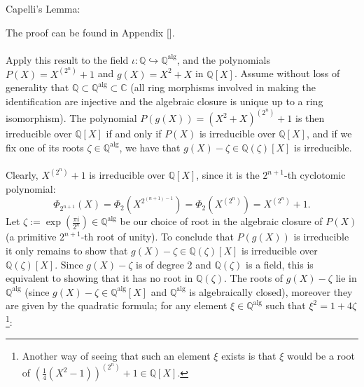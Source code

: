 \begin{solution}
\begin{lemma}{Capelli's Lemma:}
\begin{enumerate}
        \end{enumerate}
    \end{lemma}
    The proof can be found in Appendix [].
    \\\\
    Apply this result to the field \( \iota:\mathbb{Q}\hookrightarrow \mathbb{Q}^{\mathrm{alg}} \), and the polynomials \( P\left(X\right) = X^{\left(2^{n}\right)} + 1 \) and \( g\left(X\right) = X^2 + X \) in \( \mathbb{Q}\left[X\right] \). Assume without loss of generality that \( \mathbb{Q}\subset\mathbb{Q}^{\text{alg}}\subset\mathbb{C} \) (all ring morphisms involved in making the identification are injective and the algebraic closure is unique up to a ring isomorphism). The polynomial \( P\left( g\left(X\right) \right) = \left( X^2 + X \right)^{\left(2^n\right)} + 1 \) is then irreducible over \( \mathbb{Q}\left[X\right] \) if and only if \( P\left(X\right) \) is irreducible over \( \mathbb{Q}\left[X\right] \), and if we fix one of its roots \( \zeta \in \mathbb{Q}^{\mathrm{alg}} \), we have that \( g\left(X\right) - \zeta \in \mathbb{Q}\left(\zeta\right)\left[X\right] \) is irreducible.
    \\\\
    Clearly, \( X^{\left(2^n\right)} + 1 \) is irreducible over \( \mathbb{Q}\left[X\right] \), since it is the \( 2^{n+1} \)-th cyclotomic polynomial:
    \[
        \Phi_{2^{n+1}}\left(X\right) = \Phi_{2}\left( X^{2^{\left(n+1\right)-1}} \right) = \Phi_{2}\left( X^{\left(2^{n}\right)} \right) = X^{\left(2^{n}\right)} + 1.
    \]
    Let \( \zeta := \exp\left( \frac{\pi i}{2^{n}} \right) \in \mathbb{Q}^{\text{alg}} \) be our choice of root in the algebraic closure of \( P\left(X\right) \) (a primitive \( 2^{n+1} \)-th root of unity). To conclude that \( P\left( g\left(X\right) \right) \) is irreducible it only remains to show that \( g\left(X\right) - \zeta \in \mathbb{Q}\left(\zeta\right)\left[X\right] \) is irreducible over \( \mathbb{Q}\left(\zeta\right)\left[X\right] \). Since \( g\left(X\right) - \zeta \) is of degree \( 2 \) and \( \mathbb{Q}\left(\zeta\right) \) is a field, this is equivalent to showing that it has no root in \( \mathbb{Q}\left(\zeta\right) \). The roots of \( g\left(X\right) - \zeta \) lie in \( \mathbb{Q}^{\text{alg}} \) (since \( g\left(X\right) - \zeta\in \mathbb{Q}^{\text{alg}}\left[X\right] \) and \( \mathbb{Q}^{\text{alg}} \) is algebraically closed), moreover they are given by the quadratic formula; for any element \( \xi \in \mathbb{Q}^{\text{alg}} \) such that \( \xi^2 = 1 + 4\zeta \)\footnote{Another way of seeing that such an element \( \xi \) exists is that \( \xi \) would be a root of \( \left( \frac{1}{4}\left(X^2 - 1\right) \right)^{\left(2^{n}\right)} + 1 \in \mathbb{Q}\left[X\right] \).}:

\end{solution}
